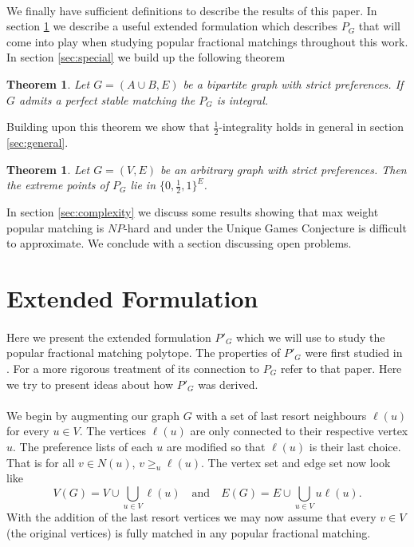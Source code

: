 \documentclass[letterpaper,12pt,oneside,onecolumn]{article}
\newtheorem{theorem}[fact]{Theorem}
\begin{document}
\paragraph{}
We finally have sufficient definitions to describe the results of this paper. In section \ref{sec:formulation} we describe a useful extended formulation which describes $P_G$ that will come into play when studying popular fractional matchings throughout this work. In section \ref{sec:special} we build up the following theorem
\begin{theorem}\label{th:special}
Let $G = (A \cup B, E)$ be a bipartite graph with strict preferences. If $G$ admits a perfect stable matching the $P_G$ is integral.
\end{theorem}
Building upon this theorem we show that $\frac{1}{2}$-integrality holds in general in section \ref{sec:general}.
\begin{theorem}\label{th:general}
Let $G=(V,E)$ be an arbitrary graph with strict preferences. Then the extreme points of $P_G$ lie in $\{0,\frac{1}{2}, 1\}^E$.
\end{theorem}
In section \ref{sec:complexity} we discuss some results showing that max weight popular matching is $NP$-hard and under the Unique Games Conjecture is difficult to approximate. We conclude with a section discussing open problems.
\section{Extended Formulation}\label{sec:formulation}

\paragraph{}
Here we present the extended formulation $P'_G$ which we will use to study the popular fractional matching polytope. The properties of $P'_G$ were first studied in \cite{kavitha2011popular}. For a more rigorous treatment of its connection to $P_G$ refer to that paper. Here we try to present ideas about how $P'_G$ was derived.

\paragraph{}
We begin by augmenting our graph $G$ with a set of last resort neighbours $\ell(u)$ for every $u \in V$. The vertices $\ell(u)$ are only connected to their respective vertex $u$. The preference lists of each $u$ are modified so that $\ell(u)$ is their last choice. That is for all $v \in N(u)$, $v \geq_u \ell(u)$. The vertex set and edge set now look like
$$V(G) = V \cup \bigcup_{u \in V} \ell(u) \quad\text{and}\quad E(G) = E \cup \bigcup_{u \in V} u\ell(u).$$  With the addition of the last resort vertices we may now assume that every $v \in V$ (the original vertices) is fully matched in any popular fractional matching.
\end{document}
